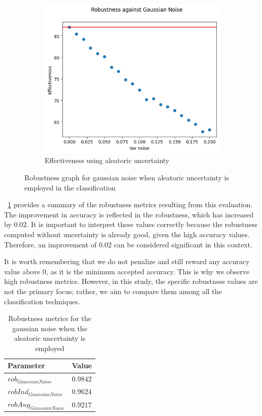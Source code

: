 \begin{figure}[h]
\begin{subfigure}{.33\textwidth}
	\centering
	\includegraphics[width=0.9\linewidth]{ImageFiles/EvalBNN/GN/AU/eff}
	\caption{Effectiveness using aleatoric uncertainty}
	\label{fig:gn_au_eff}
	\end{subfigure}
	\caption{Robustness graph for gaussian noise when aleatoric uncertainty is employed in the classification}
	\label{fig:gn_au}
\end{figure}

\Tab~\ref{table:rob_gn_au} provides a summary of the robustness metrics resulting from this evaluation. The improvement in accuracy is reflected in the robustness, which has increased by $0.02$. It is important to interpret these values correctly because the robustness computed without uncertainty is already good, given the high accuracy values. Therefore, an improvement of $0.02$ can be considered significant in this context.

It is worth remembering that we do not penalize and still reward any accuracy value above $0$, as it is the minimum accepted accuracy. This is why we observe high robustness metrics. However, in this study, the specific robustness values are not the primary focus; rather, we aim to compare them among all the classification techniques.

\begin{table}[h]
	\centering
	\begin{tabular}{|| l | l ||} 
		\hline
		\textbf{Parameter} & \textbf{Value} \\
		\hline
		\hline
		$rob_{GaussianNoise}$ & $0.9842$ \\
		$robInd_{GaussianNoise}$ & $0.9624$ \\
		$robAug_{GaussianNoise}$ & $0.9217$ \\	
		\hline
	\end{tabular}	
	\caption{Robustness metrics for the gaussian noise when the aleatoric uncertainty is employed}
	\label{table:rob_gn_au}
\end{table}


